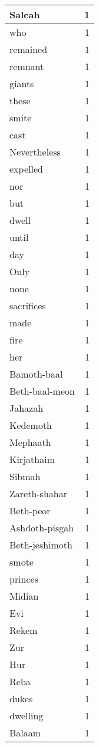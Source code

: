 \begin{center}
\begin{longtable}{l|r}
Salcah & 1\\ \hline 
who & 1\\ \hline 
remained & 1\\ \hline 
remnant & 1\\ \hline 
giants & 1\\ \hline 
these & 1\\ \hline 
smite & 1\\ \hline 
cast & 1\\ \hline 
Nevertheless & 1\\ \hline 
expelled & 1\\ \hline 
nor & 1\\ \hline 
but & 1\\ \hline 
dwell & 1\\ \hline 
until & 1\\ \hline 
day & 1\\ \hline 
Only & 1\\ \hline 
none & 1\\ \hline 
sacrifices & 1\\ \hline 
made & 1\\ \hline 
fire & 1\\ \hline 
her & 1\\ \hline 
Bamoth-baal & 1\\ \hline 
Beth-baal-meon & 1\\ \hline 
Jahazah & 1\\ \hline 
Kedemoth & 1\\ \hline 
Mephaath & 1\\ \hline 
Kirjathaim & 1\\ \hline 
Sibmah & 1\\ \hline 
Zareth-shahar & 1\\ \hline 
Beth-peor & 1\\ \hline 
Ashdoth-pisgah & 1\\ \hline 
Beth-jeshimoth & 1\\ \hline 
smote & 1\\ \hline 
princes & 1\\ \hline 
Midian & 1\\ \hline 
Evi & 1\\ \hline 
Rekem & 1\\ \hline 
Zur & 1\\ \hline 
Hur & 1\\ \hline 
Reba & 1\\ \hline 
dukes & 1\\ \hline 
dwelling & 1\\ \hline 
Balaam & 1\\ \hline 

\end{longtable}
\end{center}
